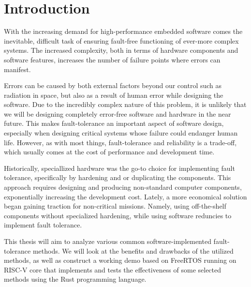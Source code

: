 \section{Introduction}

With the increasing demand for high-performance embedded software comes the inevitable, difficult task of ensuring fault-free functioning of ever-more complex systems. The increased complexity, both in terms of hardware components and software features, increases the number of failure points where errors can manifest.

Errors can be caused by both external factors beyond our control such as radiation in space, but also as a result of human error while designing the software. Due to the incredibly complex nature of this problem, it is unlikely that we will be designing completely error-free software and hardware in the near future. This makes fault-tolerance an important aspect of software design, especially when designing critical systems whose failure could endanger human life. However, as with most things, fault-tolerance and reliability is a trade-off, which usually comes at the cost of performance and development time.

Historically, speciallized hardware was the go-to choice for implementing fault tolerance, specifically by hardening and or duplicating the components. This approach requires designing and producing non-standard computer components, exponentially increasing the development cost. Lately, a more economical solution began gaining traction for non-critical missions. Namely, using off-the-shelf components without specialized hardening, while using software reduncies to implement fault tolerance.

This thesis will aim to analyze various common software-implemented fault-tolerance methods. We will look at the benefits and drawbacks of the utilized methods, as well as construct a working demo based on FreeRTOS running on RISC-V core that implements and tests the effectiveness of some selected methods using the Rust programming language.
